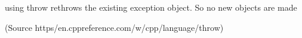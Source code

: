 using throw rethrows the existing exception object. So no new objects are made

(Source https/en.cppreference.com/w/cpp/language/throw)
